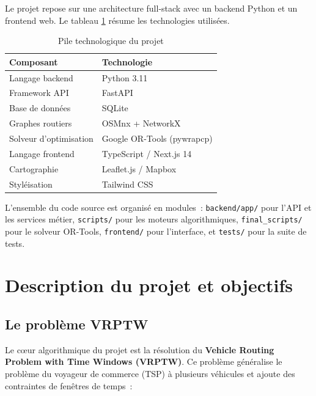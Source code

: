 \documentclass[a4paper, 12pt, twoside]{article}
\begin{document}
Le projet repose sur une architecture full-stack avec un backend Python et un frontend web. Le tableau \ref{tab:techstack} r\'{e}sume les technologies utilis\'{e}es.

\begin{table}[h]
\begin{center}
\begin{tabular}{|l|l|}
\hline
\textbf{Composant} & \textbf{Technologie} \\
\hline
Langage backend & Python 3.11 \\
\hline
Framework API & FastAPI \\
\hline
Base de donn\'{e}es & SQLite \\
\hline
Graphes routiers & OSMnx + NetworkX \\
\hline
Solveur d'optimisation & Google OR-Tools (pywrapcp) \\
\hline
Langage frontend & TypeScript / Next.js 14 \\
\hline
Cartographie & Leaflet.js / Mapbox \\
\hline
Styl\'{e}isation & Tailwind CSS \\
\hline
\end{tabular}
\end{center}
\caption{Pile technologique du projet}
\label{tab:techstack}
\end{table}

L'ensemble du code source est organis\'{e} en modules~: \texttt{backend/app/} pour l'API et les services m\'{e}tier, \texttt{scripts/} pour les moteurs algorithmiques, \texttt{final\_scripts/} pour le solveur OR-Tools, \texttt{frontend/} pour l'interface, et \texttt{tests/} pour la suite de tests.

\section{Description du projet et objectifs}

\subsection{Le probl\`{e}me VRPTW}

Le c\oe ur algorithmique du projet est la r\'{e}solution du \textbf{Vehicle Routing Problem with Time Windows (VRPTW)}. Ce probl\`{e}me g\'{e}n\'{e}ralise le probl\`{e}me du voyageur de commerce (TSP) \`{a} plusieurs v\'{e}hicules et ajoute des contraintes de fen\^{e}tres de temps~:
\end{document}

